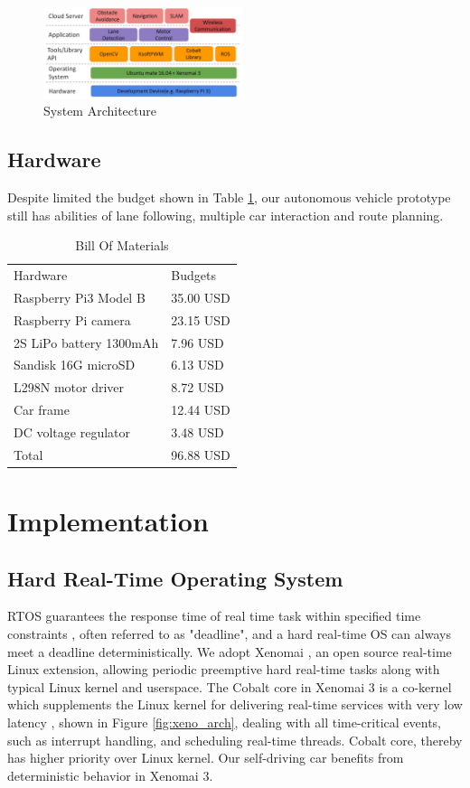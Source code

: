 \documentclass[conference]{IEEEtran}
\begin{document}
\FloatBarrier

\begin{figure}
	\centering
	\includegraphics[width=2.3in]{img/soft_arch.jpg}
	\caption{System Architecture}
	\label{fig:overall_arch}
\end{figure}

\subsection{Hardware}

Despite limited the budget shown in Table \ref{hardware_list}, our autonomous vehicle prototype still has abilities of lane following, multiple car interaction and route planning.

\begin{table}
	\centering
	\caption{Bill Of Materials}
	\label{hardware_list}
	\begin{tabular}{ll}
		Hardware                & Budgets  \\
		Raspberry Pi3 Model B   & 35.00 USD \\
		Raspberry Pi camera     & 23.15 USD  \\
		2S LiPo battery 1300mAh & 7.96 USD  \\
		Sandisk 16G microSD     & 6.13 USD  \\
		L298N motor driver      & 8.72 USD  \\
		Car frame               & 12.44 USD  \\
		DC voltage regulator    &  3.48 USD  \\
		Total                   & 96.88 USD
	\end{tabular}
\end{table}

\section{Implementation}

\subsection{Hard Real-Time Operating System}

RTOS guarantees the response time of real time task within specified time constraints \cite{RTOS}, often referred to as "deadline", and a hard real-time OS can always meet a deadline deterministically. We adopt Xenomai \cite{Xenomai}, an open source real-time Linux extension, allowing periodic preemptive hard real-time tasks along with typical Linux kernel and userspace. The Cobalt core in Xenomai 3 is a co-kernel which supplements the Linux kernel for delivering real-time services with very low latency \cite{rtlws2015}, shown in Figure \ref{fig:xeno_arch}, dealing with all time-critical events, such as interrupt handling, and scheduling real-time threads. Cobalt core, thereby has higher priority over Linux kernel. Our self-driving car benefits from deterministic behavior in Xenomai 3.
\end{document}
